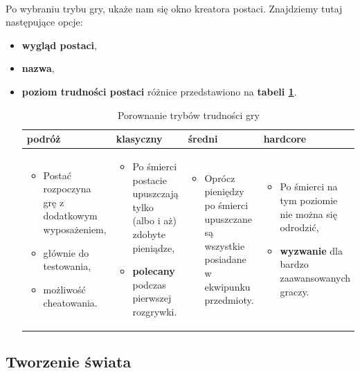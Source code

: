 \documentclass{report}
\begin{document}
\paragraph{} Po wybraniu trybu gry, ukaże nam się okno kreatora postaci. Znajdziemy tutaj następujące opcje:
\begin{itemize}
\item \textbf{wygląd postaci},
\item \textbf{nazwa},
\item \textbf{poziom trudności postaci} \ppauza różnice przedstawiono na  \textbf{tabeli \ref{tab:difficulty}}.
	\begin{table}
	\centering
	\begin{adjustwidth}{-2.4cm}{}
	\begin{tabular}{|p{0.25\linewidth}|p{0.25\linewidth}|p{0.25\linewidth}|p{0.25\linewidth}|}
	\hline
	\textbf{podróż} & \textbf{klasyczny} & \textbf{średni} & \textbf{hardcore} \\
	\hline
	\begin{itemize}
	\item Postać rozpoczyna grę z dodatkowym wyposażeniem,
	\item głównie do testowania,
	\item możliwość cheatowania. 
	\end{itemize} &
	\begin{itemize}
	\item Po śmierci postacie upuszczają tylko (albo i aż) zdobyte pieniądze, 
	\item \textbf{polecany} podczas pierwszej rozgrywki. 
	\end{itemize} & 
	\begin{itemize}
	\item Oprócz pieniędzy po śmierci upuszczane są wszystkie posiadane w ekwipunku przedmioty.
	\end{itemize} & 
	\begin{itemize}
	\item Po śmierci na tym poziomie nie można się odrodzić,
	\item \textbf{wyzwanie} dla bardzo zaawansowanych graczy.
	\end{itemize} \\
	\hline
	\end{tabular}
	\end{adjustwidth}
	\caption{Porownanie trybów trudności gry}
	\label{tab:difficulty}
	\end{table}
\end{itemize}
\subsection{Tworzenie świata}
\end{document}
